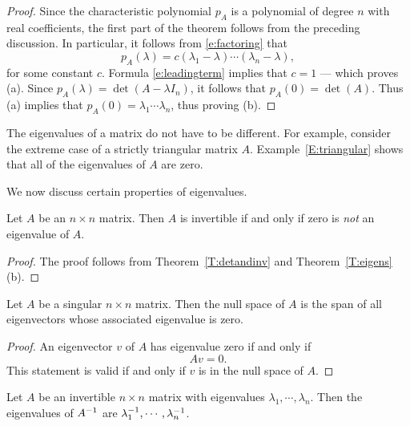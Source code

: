 \documentclass{ximera}
\begin{document}
\begin{proof} Since the characteristic polynomial $p_A$ is a polynomial
of degree $n$ with real coefficients, the first part of the
theorem follows from the preceding discussion. In particular, it follows
from \eqref{e:factoring} that 
\[
p_A(\lambda) = c(\lambda_1-\lambda)\cdots(\lambda_n-\lambda),
\]
for some constant $c$.  Formula \eqref{e:leadingterm} implies that
$c=1$ --- which proves (a).  Since $p_A(\lambda)=\det(A-\lambda I_n)$, 
it follows that $p_A(0)=\det(A)$.  Thus (a) implies 
that $p_A(0)=\lambda_1\cdots\lambda_n$, thus proving (b).  \end{proof}

The eigenvalues of a matrix do not have to be different.  For
example, consider the extreme case of a strictly triangular
matrix $A$.  Example~\ref{E:triangular} shows that all of the
eigenvalues of $A$ are zero. 

We now discuss certain properties of eigenvalues.  
\begin{corollary}  \label{C:eig=0}
Let $A$ be an $n\times n$ matrix. Then $A$ is invertible if and
only if zero is {\em not\/} an eigenvalue of $A$.
\end{corollary}  

\begin{proof} The proof follows from Theorem~\ref{T:detandinv} and
Theorem~\ref{T:eigens}(b). \end{proof} 

\begin{lemma} 
Let $A$ be a singular $n\times n$ matrix.  Then the null space of $A$
is the span of all eigenvectors whose associated eigenvalue is zero.
\end{lemma} 

\begin{proof} An eigenvector $v$ of $A$ has eigenvalue zero if and only
if 
\[
Av=0.
\]
This statement is valid if and only if $v$ is in the null space
of $A$. \end{proof}



\begin{theorem}  \label{T:inveig}
Let $A$ be an invertible $n\times n$ matrix with eigenvalues 
$\lambda_1,\cdots,\lambda_n$.  Then the eigenvalues of 
$A^{-1}$ are $\lambda_1^{-1},\cdots,\lambda_n^{-1}$.
\end{theorem}  
\end{document}
